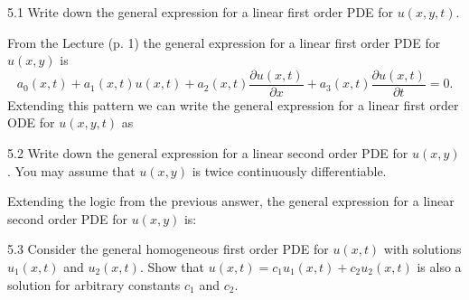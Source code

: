 
\begin{problem}{5.1}
  Write down the general expression for a linear first order PDE for $u(x,y,t)$.
\end{problem}

\begin{derivation}
  From the Lecture (p. 1) the general expression for a linear first order PDE for $u(x,y)$ is
  \begin{equation*}
    a_0(x,t) + a_1(x,t)u(x,t) + a_2(x,t) \frac{\partial u(x,t)}{\partial x} + a_3(x,t) \frac{\partial u(x,t)}{\partial t} = 0
  .\end{equation*}
  Extending this pattern we can write the general expression for a linear first order ODE for $u(x,y,t)$ as
\end{derivation}


\begin{problem}{5.2}
  Write down the general expression for a linear second order PDE for $u(x,y)$.
You may assume that $u(x,y)$ is twice continuously differentiable.
\end{problem}

\begin{derivation}
  Extending the logic from the previous answer, the general expression for a linear second order PDE for $u(x,y)$ is:
\end{derivation}


\begin{problem}{5.3}
  Consider the general homogeneous first order PDE for $u(x,t)$ with solutions $u_1(x,t)$ and $u_2(x,t)$.
Show that $u(x,t) = c_1 u_1 (x,t) + c_2 u_2 (x,t)$ is also a solution for arbitrary constants $c_1$ and $c_2$.
\end{problem}

